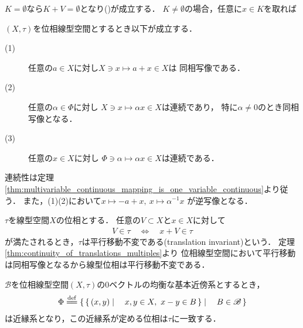 	\begin{prf}
		$K = \emptyset$なら$K + V = \emptyset$となり()が成立する．
		$K \neq \emptyset$の場合，任意に$x \in K$を取れば
	\end{prf}
	
	\begin{screen}
		\begin{thm}\label{thm:continuity_of_translations_multiples}
			$(X,\tau)$を位相線型空間とするとき以下が成立する．
			\begin{description}
				\item[(1)] 任意の$a \in X$に対し$X \ni x \longmapsto a + x \in X$は
					同相写像である．
					
				\item[(2)] 任意の$\alpha \in \Phi$に対し
					$X \ni x \longmapsto \alpha x \in X$は連続であり，
					特に$\alpha \neq 0$のとき同相写像となる．
					
				\item[(3)] 任意の$x \in X$に対し
					$\Phi \ni \alpha \longmapsto \alpha x \in X$は連続である．
			\end{description}
		\end{thm}
	\end{screen}
	
	\begin{prf}
		連続性は定理\ref{thm:multivariable_continuous_mapping_is_one_variable_continuous}より従う．
		また，(1)(2)において$x \longmapsto -a+x,\ x \longmapsto \alpha^{-1}x$
		が逆写像となる．
		\QED
	\end{prf}
	
	\begin{screen}
		\begin{thm}[平行移動不変位相]
			$\tau$を線型空間$X$の位相とする．
			任意の$V \subset X$と$x \in X$に対して
			\begin{align}
				V \in \tau \quad \Longleftrightarrow \quad
				x + V \in \tau
			\end{align}
			が満たされるとき，$\tau$は平行移動不変である(translation invariant)という．
			定理\ref{thm:continuity_of_translations_multiples}より
			位相線型空間において平行移動は同相写像となるから線型位相は平行移動不変である．
		\end{thm}
	\end{screen}
	
	\begin{screen}
		\begin{thm}[位相線型空間は一様空間]
			$\mathscr{B}$を位相線型空間$(X,\tau)$の0ベクトルの均衡な基本近傍系とするとき，
			\begin{align}
				\Phi \defeq
				\Set{\Set{(x,y)}{x,y \in X,\ x-y \in B}}{B \in \mathscr{B}}
			\end{align}
			は近縁系となり，この近縁系が定める位相は$\tau$に一致する．
		\end{thm}
	\end{screen}
	
